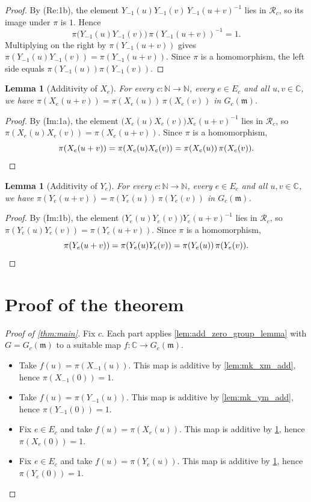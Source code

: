 \documentclass[11pt]{article}
\newtheorem{lemma}[theorem]{Lemma}
\theoremstyle{definition}
\theoremstyle{remark}
\newcommand{\Gc}{G_c(\mathfrak{m})}
\begin{document}
\begin{proof}
By (Re:1b), the element $Y_{-1}(u)Y_{-1}(v)\,Y_{-1}(u+v)^{-1}$ lies in $\mathcal{R}_c$, so its image under $\pi$ is $1$. Hence
\[
\pi\big(Y_{-1}(u)Y_{-1}(v)\big)\,\pi(Y_{-1}(u+v))^{-1}=1.
\]
Multiplying on the right by $\pi(Y_{-1}(u+v))$ gives $\pi(Y_{-1}(u)Y_{-1}(v))=\pi(Y_{-1}(u+v))$. Since $\pi$ is a homomorphism, the left side equals $\pi(Y_{-1}(u))\pi(Y_{-1}(v))$.
\end{proof}

\begin{lemma}[Additivity of $X_e$]\label{lem:mk_xx_add}
For every $c\colon\mathbb{N}\to\mathbb{N}$, every $e\in E_c$ and all $u,v\in\mathbb{C}$, we have $\pi(X_e(u+v))=\pi(X_e(u))\,\pi(X_e(v))$ in $\Gc$.
\end{lemma}

\begin{proof}
By (Im:1a), the element $\big(X_e(u)X_e(v)\big)X_e(u+v)^{-1}$ lies in $\mathcal{R}_c$, so $\pi(X_e(u)X_e(v))=\pi(X_e(u+v))$. Since $\pi$ is a homomorphism,
\[
\pi(X_e(u+v))=\pi(X_e(u)X_e(v))=\pi(X_e(u))\,\pi(X_e(v)).\qedhere
\]
\end{proof}

\begin{lemma}[Additivity of $Y_e$]\label{lem:mk_yy_add}
For every $c\colon\mathbb{N}\to\mathbb{N}$, every $e\in E_c$ and all $u,v\in\mathbb{C}$, we have $\pi(Y_e(u+v))=\pi(Y_e(u))\,\pi(Y_e(v))$ in $\Gc$.
\end{lemma}

\begin{proof}
By (Im:1b), the element $\big(Y_e(u)Y_e(v)\big)Y_e(u+v)^{-1}$ lies in $\mathcal{R}_c$, so $\pi(Y_e(u)Y_e(v))=\pi(Y_e(u+v))$. Since $\pi$ is a homomorphism,
\[
\pi(Y_e(u+v))=\pi(Y_e(u)Y_e(v))=\pi(Y_e(u))\,\pi(Y_e(v)).\qedhere
\]
\end{proof}

\section{Proof of the theorem}

\begin{proof}[Proof of \cref{thm:main}]
Fix $c$. Each part applies \cref{lem:add_zero_group_lemma} with $G=\Gc$ to a suitable map $f\colon\mathbb{C}\to\Gc$.
\begin{itemize}
\item[(a)] Take $f(u)=\pi(X_{-1}(u))$. This map is additive by \cref{lem:mk_xm_add}, hence $\pi(X_{-1}(0))=1$.
\item[(b)] Take $f(u)=\pi(Y_{-1}(u))$. This map is additive by \cref{lem:mk_ym_add}, hence $\pi(Y_{-1}(0))=1$.
\item[(c)] Fix $e\in E_c$ and take $f(u)=\pi(X_e(u))$. This map is additive by \cref{lem:mk_xx_add}, hence $\pi(X_e(0))=1$.
\item[(d)] Fix $e\in E_c$ and take $f(u)=\pi(Y_e(u))$. This map is additive by \cref{lem:mk_yy_add}, hence $\pi(Y_e(0))=1$.\qedhere
\end{itemize}
\end{proof}
\end{document}
